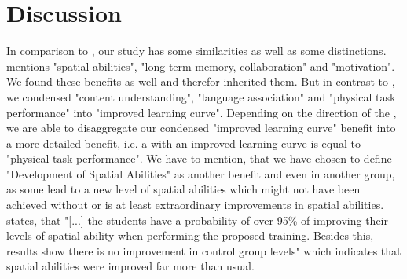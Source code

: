 \section{Discussion}
\label{sec:Discussion}
In comparison to \cite{Radu.2014}, our study has some similarities as well as some distinctions. \cite{Radu.2014} mentions "spatial abilities", "long term memory, collaboration" and "motivation". We found these benefits as well and therefor inherited them. But in contrast to \cite{Radu.2014}, we condensed "content understanding", "language association" and "physical task performance" into "improved learning curve". Depending on the direction of the \appns, we are able to disaggregate our condensed "improved learning curve" benefit into a more detailed benefit, i.e. a \ST \app with an improved learning curve is equal to "physical task performance". We have to mention, that we have chosen to define "Development of Spatial Abilities" as another benefit and even in another group, as some \apps lead to a new level of spatial abilities which might not have been achieved without \AR or is at least extraordinary improvements in spatial abilities. \cite{MartinGutierrez.2013} states, that "[...] the students have a probability of over 95\% of improving their levels of spatial ability when performing the proposed training. Besides this, results show there is no improvement in control group levels"\autocite[4]{MartinGutierrez.2013} which indicates that spatial abilities were improved far more than usual. \\

